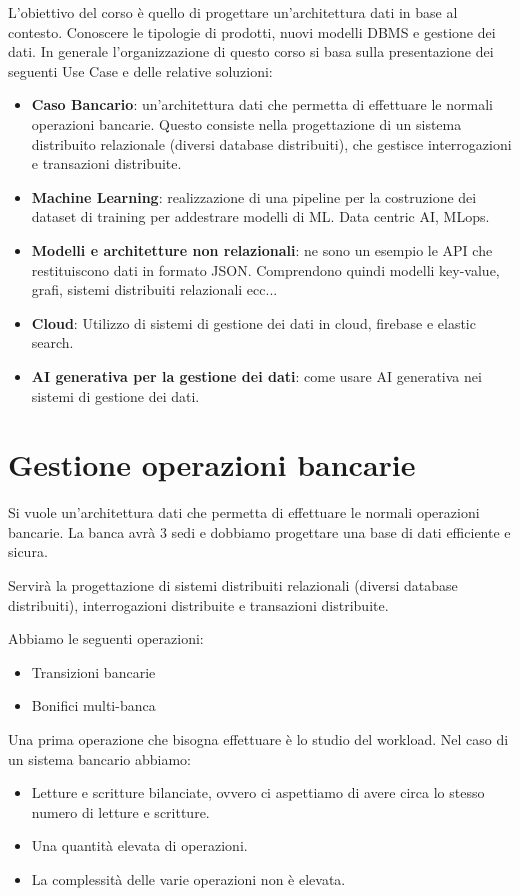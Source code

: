 L'obiettivo del corso è quello di progettare un'architettura dati in base al
contesto. Conoscere le tipologie di prodotti, nuovi modelli DBMS e gestione dei
dati. In generale l'organizzazione di questo corso si basa sulla presentazione dei
seguenti Use Case e delle relative soluzioni:
\begin{itemize}
    \item \textbf{Caso Bancario}: un'architettura dati che permetta di effettuare
          le normali operazioni bancarie. Questo consiste nella progettazione di
          un sistema distribuito relazionale (diversi database distribuiti), che
          gestisce interrogazioni e transazioni distribuite.
    \item \textbf{Machine Learning}: realizzazione di una pipeline per la
          costruzione dei dataset di training per addestrare modelli di ML.
          Data centric AI, MLops.
    \item \textbf{Modelli e architetture non relazionali}: ne sono un esempio
          le API che restituiscono dati in formato JSON. Comprendono quindi
          modelli key-value, grafi, sistemi distribuiti relazionali ecc...
    \item \textbf{Cloud}: Utilizzo di sistemi di gestione dei dati in cloud,
          firebase e elastic search.
    \item \textbf{AI generativa per la gestione dei dati}: come usare AI
          generativa nei sistemi di gestione dei dati.
\end{itemize}
\section{Gestione operazioni bancarie}
Si vuole un'architettura dati che permetta di effettuare le normali operazioni
bancarie. La banca avrà $3$ sedi e dobbiamo progettare una base di dati efficiente
e sicura.

Servirà la progettazione di sistemi distribuiti relazionali (diversi
database distribuiti), interrogazioni distribuite e transazioni distribuite.

Abbiamo le seguenti operazioni:
\begin{itemize}
    \item Transizioni bancarie
    \item Bonifici multi-banca
\end{itemize}
Una prima operazione che bisogna effettuare è lo studio del workload. Nel caso di
un sistema bancario abbiamo:
\begin{itemize}
    \item Letture e scritture bilanciate, ovvero ci aspettiamo di avere circa lo
          stesso numero di letture e scritture.
    \item Una quantità elevata di operazioni.
    \item La complessità delle varie operazioni non è elevata.
\end{itemize}

